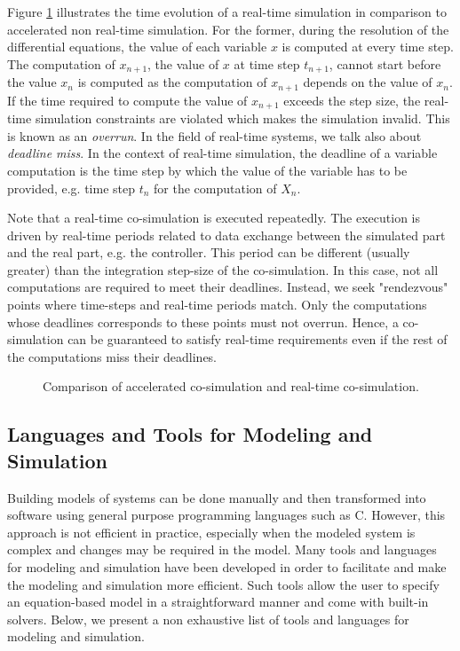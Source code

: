 Figure \ref{fig:rtcosim} illustrates the time evolution of a real-time simulation in comparison to accelerated non real-time simulation. For the former, during the resolution of the differential equations, the value of each variable $x$ is computed at every time step. The computation of $x_{n+1}$, the value of $x$ at time step $t_{n+1}$, cannot start before the value $x_n$ is computed as the computation of $x_{n+1}$ depends on the value of $x_n$. If the time required to compute the value of $x_{n+1}$ exceeds the step size, the real-time simulation constraints are violated which makes the simulation invalid. This is known as an \textit{overrun}. In the field of real-time systems, we talk also about \textit{deadline miss}. In the context of real-time simulation, the deadline of a variable computation is the time step by which the value of the variable has to be provided, e.g. time step $t_n$ for the computation of $X_n$.

Note that a real-time co-simulation is executed repeatedly. The execution is driven by real-time periods related to data exchange between the simulated part and the real part, e.g. the controller. This period can be different (usually greater) than the integration step-size of the co-simulation. In this case, not all computations are required to meet their deadlines. Instead, we seek "rendezvous" points where time-steps and real-time periods match. Only the computations whose deadlines corresponds to these points must not overrun. Hence, a co-simulation can be guaranteed to satisfy real-time requirements even if the rest of the computations miss their deadlines.   

\begin{figure}[phbt]
\centering

\caption{Comparison of accelerated co-simulation and real-time co-simulation.}
\label{fig:rtcosim}
\end{figure} 

\subsection{\label{lngtoolsMS}Languages and Tools for Modeling and Simulation}

Building models of systems can be done manually and then transformed into software using general purpose programming languages such as C. However, this approach is not efficient in practice, especially when the modeled system is complex and changes may be required in the model. Many tools and languages for modeling and simulation have been developed in order to facilitate and make the modeling and simulation more efficient. Such tools allow the user to specify an equation-based model in a straightforward manner and come with built-in solvers. Below, we present a non exhaustive list of tools and languages for modeling and simulation.

